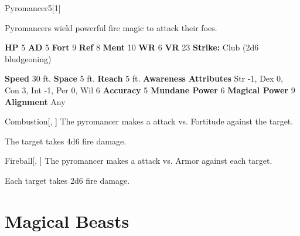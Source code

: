   
  \begin{monsection}{Pyromancer}{5}[1]
    \vspace{-1em}\vspace{-1em}
    \vspace{0em}

    
        Pyromancers wield powerful fire magic to attack their foes.
      

    \begin{spellcontent}
      \begin{spelltargetinginfo}
        \pari \textbf{HP} 5 \monsep
          \textbf{AD} 5 \monsep
          \textbf{Fort} 9 \monsep
          \textbf{Ref} 8 \monsep
          \textbf{Ment} 10
        \pari \textbf{WR} 6 \monsep
        \textbf{VR} 23
        \pari \textbf{Strike:}
            Club  (2d6 bludgeoning)
      \end{spelltargetinginfo}
    \end{spellcontent}
    \begin{monsterfooter}
      \pari \textbf{Speed} 30 ft. \monsep
        \textbf{Space} 5 ft. \monsep
        \textbf{Reach} 5 ft.
      \pari \textbf{Awareness} 
      \pari \textbf{Attributes}
        Str -1, Dex 0,
        Con 3, Int -1,
        Per 0, Wil 6
      \pari \textbf{Accuracy} 5 \monsep
        \textbf{Mundane Power} 6 \monsep
      \textbf{Magical Power} 9
      \pari \textbf{Alignment} Any
    \end{monsterfooter}
  \end{monsection}
  \begin{freeability}{Combustion}[, ]
       The pyromancer makes a  attack
        vs. Fortitude against the target.
    
    \hit The target takes 4d6 fire damage.
    \end{freeability}
  

    \begin{freeability}{Fireball}[, ]
       The pyromancer makes a  attack
        vs. Armor against each target.
    
    \hit Each target takes 2d6 fire damage.
    \end{freeability}
  
        \newpage
        \section{Magical Beasts}

